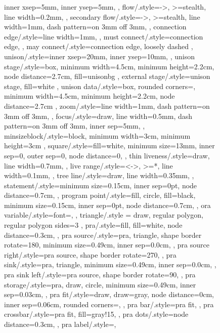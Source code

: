\documentclass[acmsmall,authorversion,nonacm]{acmart}
\begin{document}
\begin{figure}
{{{{{    inner xsep=5mm,
    inner ysep=5mm,
  },
  flow/.style={->,
    >=stealth,
    line width=0.2mm,
  },
  secondary flow/.style={->,
    >=stealth,
    line width=1mm,
    dash pattern=on 3mm off 3mm,
  },
  connection edge/.style={line width=1mm,
  },
  must connect/.style={connection edge,
  },
  may connect/.style={connection edge,
    loosely dashed
  },
  unison/.style={inner xsep=20mm,
    inner ysep=10mm,
  },
  unison stage/.style={box,
    minimum width=4.5cm,
    minimum height=2.2cm,
    node distance=2.7cm,
    fill=unisonbg
  },
  external stage/.style={unison stage,
    fill=white
  },
  unison data/.style={box,
    rounded corners=\cornerRadius,
    minimum width=4.5cm,
    minimum height=2.2cm,
    node distance=2.7cm
  },
  zoom/.style={line width=1mm,
    dash pattern=on 3mm off 3mm,
  },
  focus/.style={draw,
    line width=0.5mm,
    dash pattern=on 3mm off 3mm,
    inner sep=5mm,
  },
  minsizeblock/.style={block,
    minimum width=3cm,
    minimum height=3cm
  },
  square/.style={fill=white,
    minimum size=13mm,
    inner sep=0,
    outer sep=0,
    node distance=0,
  },
  thin liveness/.style={draw,
    line width=0.7mm,
  },
  live range/.style={<->,
      >=*,
      line width=0.1mm,
    },
  tree line/.style={draw,
    line width=0.35mm,
  },
  statement/.style={minimum size=0.15cm,
    inner sep=0pt,
    node distance=0.7cm,
  },
  program point/.style={fill,
    circle,
    fill=black,
    minimum size=0.15cm,
    inner sep=0pt,
    node distance=0.7cm,
  },
  ora variable/.style={font=\small,
  },
  triangle/.style = {draw, regular polygon, regular polygon sides=3 },
  pra/.style={fill,
    fill=white,
    node distance=0.3cm,
  },
  pra source/.style={pra,
    triangle,
    shape border rotate=180,
    minimum size=0.49cm,
    inner sep=0.0cm,
  },
  pra source right/.style={pra source,
    shape border rotate=270,
  },
  pra sink/.style={pra,
    triangle,
    minimum size=0.49cm,
    inner sep=0.0cm,
  },
  pra sink left/.style={pra source,
    shape border rotate=90,
  },
  pra storage/.style={pra,
    draw,
    circle,
    minimum size=0.49cm,
    inner sep=0.03cm,
  },
  pra fit/.style={draw,
    draw=gray,
    node distance=0cm,
    inner sep=0.06cm,
    rounded corners=\cornerRadius,
  },
  pra bar/.style={pra fit,
  },
  pra crossbar/.style={pra fit,
    fill=gray!15,
  },
  pra dots/.style={node distance=0.3cm,
  },
  pra label/.style={},
} \begin{tikzpicture}

\end{tikzpicture}}}}
\end{figure}
\end{document}
